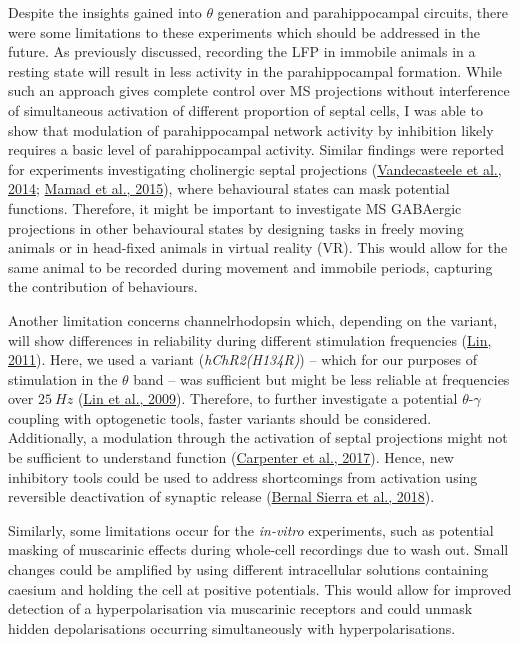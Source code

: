 \documentclass[
  12pt,
  a4paper,
  openany]{book}
\begin{document}
Despite the insights gained into \(\theta\) generation and parahippocampal circuits, there were some limitations to these experiments which should be addressed in the future. As previously discussed, recording the LFP in immobile animals in a resting state will result in less activity in the parahippocampal formation. While such an approach gives complete control over MS projections without interference of simultaneous activation of different proportion of septal cells, I was able to show that modulation of parahippocampal network activity by inhibition likely requires a basic level of parahippocampal activity. Similar findings were reported for experiments investigating cholinergic septal projections (\protect\hyperlink{ref-vandecasteele_optogenetic_2014}{Vandecasteele et al., 2014}; \protect\hyperlink{ref-mamad_medial_2015}{Mamad et al., 2015}), where behavioural states can mask potential functions. Therefore, it might be important to investigate MS GABAergic projections in other behavioural states by designing tasks in freely moving animals or in head-fixed animals in virtual reality (VR). This would allow for the same animal to be recorded during movement and immobile periods, capturing the contribution of behaviours.

Another limitation concerns channelrhodopsin which, depending on the variant, will show differences in reliability during different stimulation frequencies (\protect\hyperlink{ref-lin_users_2011}{Lin, 2011}). Here, we used a variant (\emph{hChR2(H134R)}) -- which for our purposes of stimulation in the \(\theta\) band -- was sufficient but might be less reliable at frequencies over \(25\ Hz\) (\protect\hyperlink{ref-lin_characterization_2009}{Lin et al., 2009}). Therefore, to further investigate a potential \(\theta\)-\(\gamma\) coupling with optogenetic tools, faster variants should be considered. Additionally, a modulation through the activation of septal projections might not be sufficient to understand function (\protect\hyperlink{ref-carpenter_modulating_2017}{Carpenter et al., 2017}). Hence, new inhibitory tools could be used to address shortcomings from activation using reversible deactivation of synaptic release (\protect\hyperlink{ref-bernal_sierra_potassium_2018}{Bernal Sierra et al., 2018}).

Similarly, some limitations occur for the \emph{in-vitro} experiments, such as potential masking of muscarinic effects during whole-cell recordings due to wash out. Small changes could be amplified by using different intracellular solutions containing caesium and holding the cell at positive potentials. This would allow for improved detection of a hyperpolarisation via muscarinic receptors and could unmask hidden depolarisations occurring simultaneously with hyperpolarisations.
\end{document}
